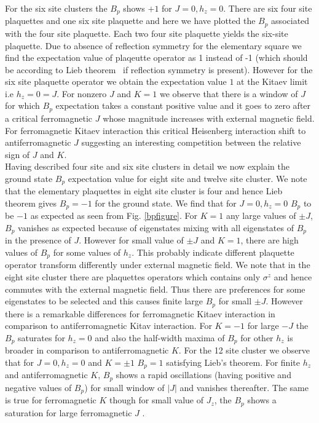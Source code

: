 \documentclass[aps,amsmath,twocolumn,amssymb,floatfix,showpacs,superscriptaddress,nofootinbib,longbibliography]{revtex4-1}
\begin{document}
For the six site clusters the  $B_p$ shows $+1$ for $J=0, h_z=0$. There are six four site plaquettes and one six site plaquette and here we have plotted the $B_p$ associated with the four site plaquette. Each two four site plaquette yields the six-site plaquette. Due to absence of reflection symmetry for the elementary square we find the expectation value of plaqeutte operator as 1 instead of -1 (which should be according to Lieb theorem~\cite{lieb-1994} if reflection symmetry is present). However for  the six site plaquette operator we obtain the expectation value $1$ at the Kitaev limit i.e $h_z=0=J$.  For nonzero $J$ and $K=1$ we observe that there is a window of $J$ for which  $B_p$ expectation takes a constant positive value and it goes to zero after a critical ferromagnetic $J$ whose magnitude increases with external magnetic field. For ferromagnetic Kitaev interaction this critical Heisenberg interaction shift to antiferromagnetic $J$  suggesting an interesting competition between the relative sign of $J$ and $K$.\\
\indent
Having described four site and six site clusters in detail we now explain the ground state $B_p$ expectation value for eight site and twelve site cluster. We note that the elementary plaquettes in eight site cluster is four and hence Lieb theorem gives $B_p=-1$ for the ground state. We find that for $J=0, h_z=0$ $B_p$ to be $-1$ as expected as seen from Fig. \ref{bpfigure}. For $K=1$ any large values of $\pm J$,  $B_p$ vanishes as expected because of eigenstates mixing with all eigenstates of $B_p$ in the presence of $J$. However for small value
of $\pm J$ and $K=1$, there are high values of $B_p$ for some values of $h_z$. This probably indicate different plaquette operator transform differently under external magnetic field. We note that in the eight site cluster there are plaquettes operators which contains only $\sigma^z$ and hence commutes with the external magnetic field. Thus there are preferences for some eigenstates to be selected and this causes finite large $B_p$ for small $\pm J$. However there is a remarkable differences for ferromagnetic Kitaev interaction in comparison to antiferromagnetic Kitav interaction. For $K=-1$ for large $-J$ the $B_p$ saturates for $h_z=0$ and also the half-width maxima of $B_p$ for other $h_z$ is broader in comparison to antiferromagnetic $K$. For the 12 site cluster we observe that for $J=0, h_z=0$ and $K=\pm 1$  $B_p=1$ satisfying Lieb's theorem. For finite $h_z$ and antiferromagnetic $K$, $B_p$ shows a rapid oscillations (having positive and negative values of $B_p$) for small window of $|J|$ and vanishes thereafter.  The same is true for ferromagnetic $K$ though for small value of $J_z$, the $B_p$  shows a saturation for large ferromagnetic $J$ \cite{zhu-2018,han-li-2023,nandini-2019,liang-2018,yilmaz-2022}.\\
\end{document}
